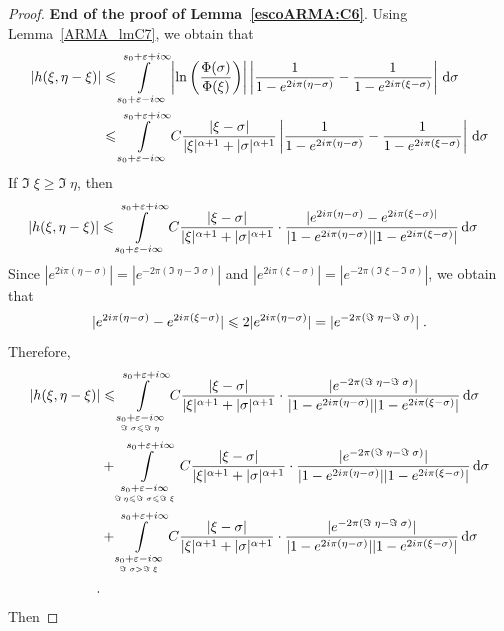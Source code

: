 \begin{proof}
\noindent \textbf{End of the proof of Lemma~\ref{escoARMA:C6}}. Using Lemma~\ref{ARMA_lmC7}, we obtain that 
\begin{align*}
    |h(\xi, \eta-\xi)| 
    &\leqslant     \int\limits_{s_0+\varepsilon-i\infty}^{s_0+\varepsilon+i\infty}
    \left| \ln \left( \frac{\Phi(\sigma)}{\Phi(\xi)}\right)\right| 
    \left|
        \frac{1}{1-e^{2i\pi(\eta-\sigma)}} - \frac{1}{1-e^{2i\pi(\xi-\sigma)}}
    \right| \,\mathrm{d} \sigma \\
    &\leqslant   \int\limits_{s_0+\varepsilon-i\infty}^{s_0+\varepsilon+i\infty}
    C \frac{|\xi - \sigma|}{|\xi|^{\alpha+1} + |\sigma|^{\alpha+1}}
    \left|
        \frac{1}{1-e^{2i\pi(\eta-\sigma)}} - \frac{1}{1-e^{2i\pi(\xi-\sigma)}}
    \right| \,\mathrm{d} \sigma \\
\end{align*}
If $\Im \; \xi \geq \Im\;\eta$, then 
\begin{align*}
    |h(\xi, \eta-\xi)| 
    &\leqslant     \int\limits_{s_0+\varepsilon-i\infty}^{s_0+\varepsilon+i\infty}
   C \frac{|\xi - \sigma|}{|\xi|^{\alpha+1} + |\sigma|^{\alpha+1}} \cdot
        \frac{|e^{2i\pi(\eta-\sigma)}-e^{2i\pi(\xi-\sigma)|}}{|1-e^{2i\pi(\eta-\sigma)}||1-e^{2i\pi(\xi-\sigma)}|}
     \,\mathrm{d} \sigma
\end{align*}
Since $|e^{2i\pi(\eta-\sigma)}| = |e^{-2\pi(\Im\;\eta- \Im\;\sigma)}|$ and $|e^{2i\pi(\xi-\sigma)}| = |e^{-2\pi(\Im\;\xi- \Im\;\sigma)}|$, we obtain that 
$$ |e^{2i\pi(\eta-\sigma)}-e^{2i\pi(\xi-\sigma)}| \leqslant 2|e^{2i\pi(\eta-\sigma)}| = |e^{-2\pi(\Im\;\eta- \Im\;\sigma)}|\; . $$
Therefore, 
\begin{align*}
    |h(\xi, \eta-\xi)| 
    &\leqslant  \int\limits_{\underset{\Im\;\sigma \leqslant \Im\;\eta}{s_0+\varepsilon-i\infty}}^{s_0+\varepsilon+i\infty}
    C \frac{|\xi - \sigma|}{|\xi|^{\alpha+1} + |\sigma|^{\alpha+1}} \cdot
         \frac{|e^{-2\pi(\Im\;\eta- \Im\;\sigma)}|}{|1-e^{2i\pi(\eta-\sigma)}||1-e^{2i\pi(\xi-\sigma)}|}
      \,\mathrm{d} \sigma \\
    &+  \int\limits_{\underset{\Im\, \eta \leqslant \Im\;\sigma \leqslant \Im\;\xi}{s_0+\varepsilon-i\infty}}^{s_0+\varepsilon+i\infty}
     C \frac{|\xi - \sigma|}{|\xi|^{\alpha+1} + |\sigma|^{\alpha+1}} \cdot
          \frac{|e^{-2\pi(\Im\;\eta- \Im\;\sigma)}|}{|1-e^{2i\pi(\eta-\sigma)}||1-e^{2i\pi(\xi-\sigma)}|}
       \,\mathrm{d} \sigma \\
    &+  \int\limits_{\underset{\Im\;\sigma > \Im\;\xi}{s_0+\varepsilon-i\infty}}^{s_0+\varepsilon+i\infty}
    C \frac{|\xi - \sigma|}{|\xi|^{\alpha+1} + |\sigma|^{\alpha+1}} \cdot
         \frac{|e^{-2\pi(\Im\;\eta- \Im\;\sigma)}|}{|1-e^{2i\pi(\eta-\sigma)}||1-e^{2i\pi(\xi-\sigma)}|}
      \,\mathrm{d} \sigma \\
      \; .
\end{align*}
Then 



\end{proof}
